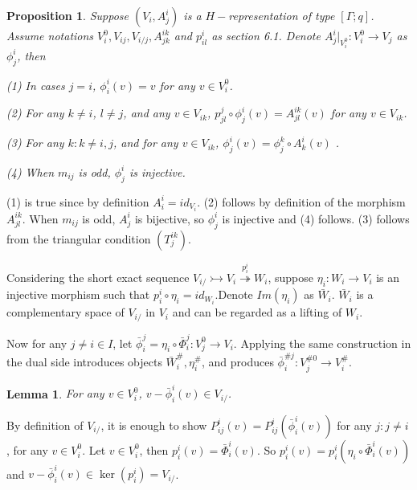 \def\CTEXPreproc{Created by ctex v0.2.12, don't edit!}\documentclass[11pt]{article}
\newtheorem{lem}{Lemma}[section]
\newtheorem{prop}{Proposition}[section]
\begin{document}
  \begin{prop} Suppose $(V_i , A^i _j )$ is a $H-$representation of type $[\Gamma;q]$. Assume notations $V^0 _{i}, V_{ij}, V_{i/j}, A^{ik}_{jk}$ and $p^i _{il}$ as section 6.1. Denote $A^i _j |_{V^0 _i }: V^0 _i \rightarrow V_j  $ as $\phi^i _j$, then

  \noindent(1) In cases $j=i$, $\phi^i _i (v) =v $ for any $v\in V^0 _i $.

  \noindent(2) For any $k\neq i$, $l\neq j$, and any $v\in V_{ik}$,  $p^j  _{jl}\circ \phi^i _j (v) = A^{ik}_{jl}(v) $ for any $v\in V_{ik}$.

  \noindent(3) For any $k:k\neq i,j$, and for any $v\in V_{ik}$, $\phi^i _j (v)= \phi^k _j \circ A^i _k (v)  $ .


  \noindent(4) When $m_{ij}$ is odd, $\phi^i _j$ is injective.


  \end{prop}

  \begin{pf}
  (1) is true since by definition  $A^i _i = id_{V_i }$. (2) follows by definition of the morphism $A^{ik}_{jl}$. When $m_{ij}$ is odd, $A^i _j$ is bijective, so $\phi^i _j$ is injective and (4) follows. (3) follows from the triangular condition $(T^{ik}_j )$.  \\
  \end{pf}

 Considering the short exact sequence  $V_{i/}\rightarrowtail V_i \stackrel{p^i _i }{\twoheadrightarrow} W_i $, suppose
 $\eta_i : W_i \rightarrow V_i$ is an injective morphism such that $p^i _i \circ \eta_i = id_{W_i}   $.Denote $Im (\eta_i)$ as $\bar{W}_i$.
  $\bar{W}_i$ is a complementary space of $V_{i/}$ in $V_i$ and can be regarded as a lifting of $W_i$.



  Now for any $j\neq i\in I$, let $\bar{\phi}^{ j} _i =\eta_i \circ \bar{\Phi}^j _i : V^0 _j \rightarrow V_i$. Applying the same construction in the dual side introduces objects $ \bar{W}^{\#}_i , \eta^{\#}_i $, and    produces $\bar{\phi}^{ \# j}_i : V^{\# 0} _j \rightarrow V^{\# } _i $.

  \begin{lem}
  For any $v\in V^0 _i$, $v-\bar{\phi}^{ i} _i (v) \in V_{i/}$.
  \end{lem}

  \begin{pf}
  By definition of $V_{i/}$, it is enough to show $P^{i} _{ij} (v) = P^i _{ij} (\bar{\phi}^{ i} _i (v)   )   $ for any $j: j\neq i$, for any $v\in V^0 _i$.  Let $v\in V^0 _i$, then $p^i _i (v)= \bar{\Phi}^i _i (v)$. So
   $p^i _i (v)= p^i _i ( \eta_i \circ \bar{\Phi}^i _i (v)  )  $ and $v-\bar{\phi}^{ i} _i (v) \in \ker(p^i _i) = V_{i/}$.\\
  \end{pf}
\end{document}
